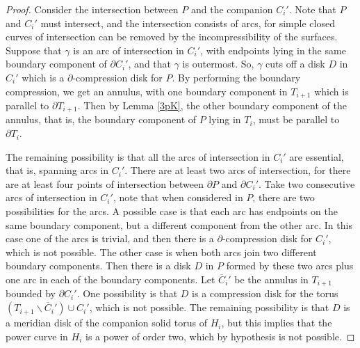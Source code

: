 \documentclass[12pt]{amsart}
\begin{document}
\begin{proof}
Consider the intersection between $P$ and the companion $C_i'$. Note that $P$ and $C_i'$ must intersect, and the intersection consists of arcs, for simple closed curves of intersection can be removed by the incompressibility of the surfaces. Suppose that $\gamma$ is an arc of intersection in $C_i'$, with endpoints lying in the same boundary component of $\partial C_i'$, and that $\gamma$ is outermost. So, $\gamma$ cuts off a disk $D$ in $C_i'$ which is a $\partial$-compression disk for $P$. By performing the boundary compression, we get an annulus, with one boundary component in $T_{i+1}$ which is parallel to $\partial T_{i+1}$. Then by Lemma \ref{3pK}, the other boundary component of the annulus, that is, the boundary component of $P$ lying in $T_i$, must be parallel to $\partial T_i$.

The remaining possibility is that all the arcs of intersection in $C_i'$ are essential, that is, spanning arcs in $C_i'$. There are at least two arcs of intersection, for there are at least four points of intersection between $\partial P$ and $\partial C_i'$. Take two consecutive arcs of intersection in $C_i'$, note that when considered in $P$, there are two possibilities for the arcs. A possible case is that each arc has endpoints on the same boundary component, but a different component from the other arc. In this case one of the arcs is trivial, and then there is a $\partial$-compression disk for $C_i'$, which is not possible. The other case is when both arcs join two different boundary components. Then there is a disk $D$ in $P$ formed by these two arcs plus one arc in each of the boundary components. Let $\overline{C}_i'$ be the annulus in $T_{i+1}$ bounded by $\partial C_i'$. One possibility is that $D$ is a compression disk for the torus $(T_{i+1}\backslash \overline{C}_i' )\cup C_i'$, which is not possible. The remaining possibility is that $D$ is a meridian disk of the companion solid torus of $H_i$, but this implies that the power curve in $H_i$ is a power of order two, which by hypothesis is not possible.
\end{proof}
\end{document}
